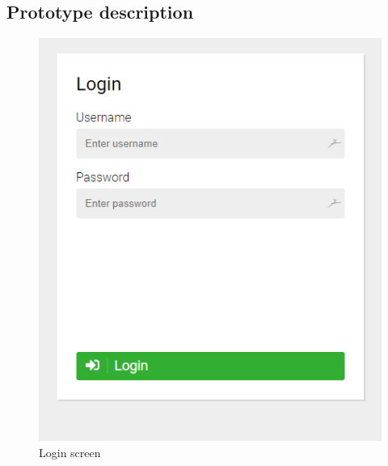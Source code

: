 \subsection{Prototype description}
\begin{table}[H]
    \begin{minipage}{.33\textwidth}
        \begin{figure}[H]
            \centering
            \includegraphics[width=0.95\linewidth]{InteraktionsDesign/Assets/Prototype/1.png}
            \caption{Login screen}
            \label{fig:prototype1}
        \end{figure}
    \end{minipage}
    \begin{minipage}{.33\textwidth}
        \begin{figure}[H]
            \centering

\end{figure}
\end{minipage}
\end{table}
